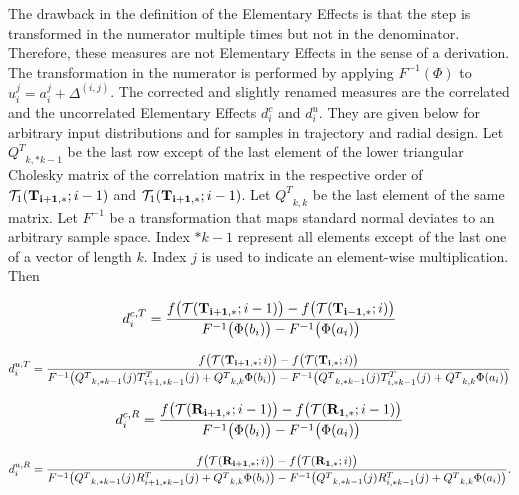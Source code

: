 \documentclass[a4paper,12pt]{article}
\begin{document}
The drawback in the definition of the Elementary Effects is that the step is transformed in the numerator multiple times but not in the denominator. Therefore, these measures are not Elementary Effects in the sense of a derivation. The transformation in the numerator is performed by applying $F^{-1}(\Phi)$ to $u_i^j = a_i^j + \Delta^{(i,j)}$. The corrected and slightly renamed measures are the correlated and the uncorrelated Elementary Effects $d_i^{c}$ and $d_i^{u}$. They are given below for arbitrary input distributions and for samples in trajectory and radial design. Let ${Q^T}_{k,*k-1}$ be the last row except of the last element of the lower triangular Cholesky matrix of the correlation matrix in the respective order of $\mathcal{T}_1(\bold{T_{i+1,*}}; i-1)$ and $\mathcal{T}_1(\bold{T_{i+1,*}}; i-1)$. Let ${Q^T}_{k,k}$ be the last element of the same matrix. Let $F^{-1}$ be a transformation that maps standard normal deviates to an arbitrary sample space. Index $*k-1$ represent all elements except of the last one of a vector of length $k$. Index $j$ is used to indicate an element-wise multiplication. Then

\begin{align}
d_i^{c,T} = \frac{f\big(\mathcal{T}(\bold{T_{i+1,*}}; i-1)\big) - f\big(\mathcal{T}(\bold{T_{i-1,*}}; i)\big)}{F^{-1}\big(\Phi(b_i)\big) - F^{-1}\big( \Phi(a_i)\big)}
\end{align}

\begin{align}
d_i^{u, T} = \frac{f\big(\mathcal{T}(\bold{T_{i+1,*}}; i)\big) - f\big(\mathcal{T}(\bold{T_{i,*}}; i)\big)}{F^{-1}\big({Q^T}_{k,*k-1}(j)T_{i+1,*k-1}^T(j) + {Q^T}_{k,k} \Phi(b_i)\big) - F^{-1}\big({Q^T}_{k,*k-1}(j)T_{i,*k-1}^T(j)+{Q^T}_{k,k} \Phi(a_i)\big)}
\end{align}

\begin{align}
d_i^{c, R} = \frac{f\big(\mathcal{T}(\bold{R_{i+1,*}}; i-1)\big) - f\big(\mathcal{T}(\bold{R_{1,*}}; i-1)\big)}{F^{-1}\big( \Phi(b_i)\big) - F^{-1}\big( \Phi(a_i)\big)}
\end{align}

\begin{align}
d_i^{u, R} = \frac{f\big(\mathcal{T}(\bold{R_{i+1,*}}; i)\big) - f\big(\mathcal{T}(\bold{R_{1,*}}; i)\big)}{F^{-1}\big({Q^T}_{k,*k-1}(j)R_{i+1,*k-1}^T(j) + {Q^T}_{k,k} \Phi(b_i)\big) - F^{-1}\big({Q^T}_{k,*k-1}(j)R_{i,*k-1}^T(j)+{Q^T}_{k,k} \Phi(a_i)\big)}.
\end{align}
\end{document}
